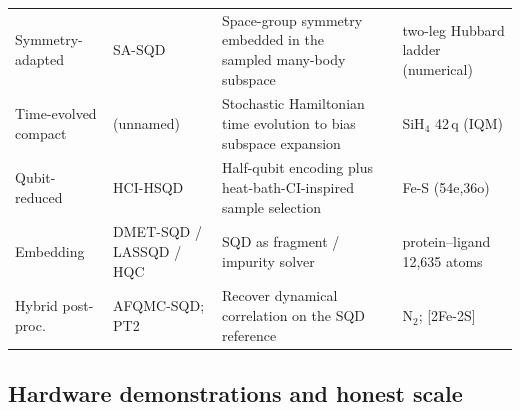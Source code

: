 \documentclass[onecolumn,a4paper]{quantumarticle}
\begin{document}
\begin{table}[t]
\begin{tabularx}{\textwidth}{@{}>{\raggedright\arraybackslash}p{2.6cm} >{\raggedright\arraybackslash}p{2.0cm} >{\raggedright\arraybackslash}X >{\raggedright\arraybackslash}p{2.4cm} >{\raggedright\arraybackslash}p{1.8cm}@{}}
Symmetry-adapted & SA-SQD & Space-group symmetry embedded in the sampled many-body subspace & \cite{nogaki2026} & two-leg Hubbard ladder (numerical) \\
Time-evolved compact & (unnamed) & Stochastic Hamiltonian time evolution to bias subspace expansion & \cite{weaving2025} & SiH$_4$ 42\,q (IQM) \\
Qubit-reduced & HCI-HSQD & Half-qubit encoding plus heat-bath-CI-inspired sample selection & \cite{mcfarthing2026} & Fe-S (54e,36o) \\
Embedding & DMET-SQD / LASSQD / HQC & SQD as fragment / impurity solver & \cite{shajan2025,wang2026} & protein--ligand 12{,}635 atoms \cite{merz2026} \\
Hybrid post-proc. & AFQMC-SQD; PT2 & Recover dynamical correlation on the SQD reference & \cite{danilov2025,erhart2025} & N$_2$; [2Fe-2S] \\
\bottomrule
\end{tabularx}
\end{table}

\subsection{Hardware demonstrations and honest scale}\label{sec:2-3}
\end{document}
